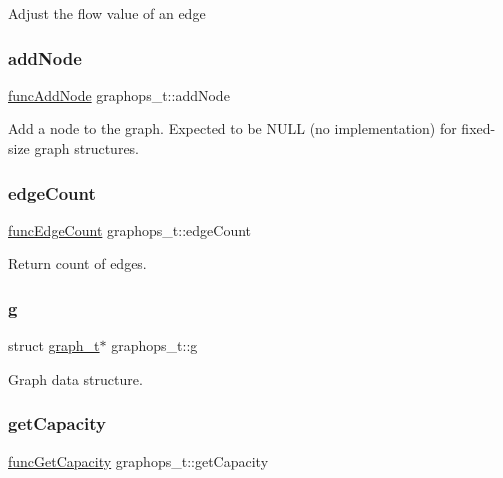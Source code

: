 Adjust the flow value of an edge \mbox{\label{structgraphops__t_aa1fdab76a86ab2889415964b51f1738f}} 
\subsubsection{\texorpdfstring{add\+Node}{addNode}}
{\footnotesize\ttfamily \hyperlink{graphops_8h_a1fa386709ec061d33a9b473357ac1f48}{func\+Add\+Node} graphops\+\_\+t\+::add\+Node}



Add a node to the graph. Expected to be N\+U\+LL (no implementation) for fixed-\/size graph structures. 

\mbox{\label{structgraphops__t_a5db6e2eee59ada7705fb54bf5f6b9ee1}} 
\subsubsection{\texorpdfstring{edge\+Count}{edgeCount}}
{\footnotesize\ttfamily \hyperlink{graphops_8h_afd0afa57e6480d123698f5e836868daa}{func\+Edge\+Count} graphops\+\_\+t\+::edge\+Count}



Return count of edges. 

\mbox{\label{structgraphops__t_ac78af00da8d2616ef3499a9632309316}} 
\subsubsection{\texorpdfstring{g}{g}}
{\footnotesize\ttfamily struct \hyperlink{structgraph__t}{graph\+\_\+t}$\ast$ graphops\+\_\+t\+::g}



Graph data structure. 

\mbox{\label{structgraphops__t_a2c16b33828f7304837b679fcf2ead523}} 
\subsubsection{\texorpdfstring{get\+Capacity}{getCapacity}}
{\footnotesize\ttfamily \hyperlink{graphops_8h_a0641347fdbb9412ba9ccef3a27da914c}{func\+Get\+Capacity} graphops\+\_\+t\+::get\+Capacity}



